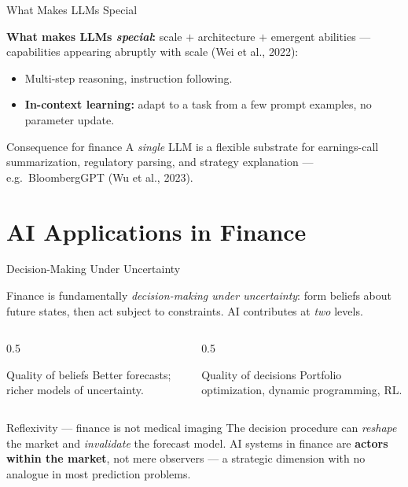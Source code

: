\documentclass[9pt,t]{beamer}
\begin{document}
\begin{frame}{What Makes LLMs Special}

\textbf{What makes LLMs \emph{special}:} scale $+$ architecture $+$ \alert{emergent abilities}
--- capabilities appearing abruptly with scale (Wei et al., 2022):
\begin{itemize}
  \item Multi-step reasoning, instruction following.
  \item \textbf{In-context learning:} adapt to a task from a few prompt examples, no parameter update.
\end{itemize}

\medskip
\begin{block}{Consequence for finance}
A \emph{single} LLM is a flexible substrate for earnings-call summarization,
regulatory parsing, and strategy explanation --- e.g.\ BloombergGPT (Wu et al., 2023).
\end{block}
\end{frame}

\section{AI Applications in Finance}

\begin{frame}{Decision-Making Under Uncertainty}

\begin{bigpicture}
Finance is fundamentally \emph{decision-making under uncertainty}: form beliefs
about future states, then act subject to constraints. AI contributes at \emph{two} levels.
\end{bigpicture}

\medskip
\begin{columns}[T]
\begin{column}{0.5\textwidth}
\begin{block}{Quality of beliefs}
Better forecasts; richer models of uncertainty.
\end{block}
\end{column}
\begin{column}{0.5\textwidth}
\begin{block}{Quality of decisions}
Portfolio optimization, dynamic programming, RL.
\end{block}
\end{column}
\end{columns}

\medskip
\begin{alertblock}{Reflexivity --- finance is not medical imaging}
The decision procedure can \emph{reshape} the market and \emph{invalidate} the
forecast model. AI systems in finance are \textbf{actors within the market}, not
mere observers --- a strategic dimension with no analogue in most prediction problems.
\end{alertblock}
\end{frame}
\end{document}

